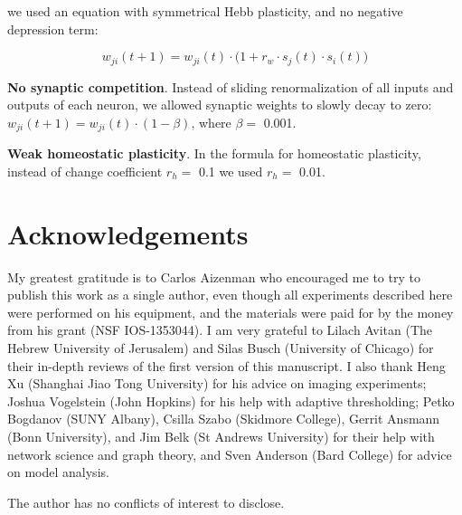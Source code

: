 \documentclass{article}
\begin{document}
we used an equation with symmetrical Hebb plasticity, and no negative depression term: 

\[ w_{ji}(t+1) = w_{ji}(t)\cdot\Big(1+r_w \cdot s_j(t) \cdot s_i(t)\Big) \]

\textbf{No synaptic competition}. Instead of sliding renormalization of all inputs and outputs of each neuron, we allowed synaptic weights to slowly decay to zero: $w_{ji}(t+1) = w_{ji}(t)\cdot (1-\beta)$, where $\beta=$ 0.001.

\textbf{Weak homeostatic plasticity}. In the formula for homeostatic plasticity, instead of change coefficient $r_h=$ 0.1 we used $r_h=$ 0.01.

\section*{Acknowledgements}

My greatest gratitude is to Carlos Aizenman who encouraged me to try to publish this work as a single author, even though all experiments described here were performed on his equipment, and the materials were paid for by the money from his grant (NSF IOS-1353044). I am very grateful to Lilach Avitan (The Hebrew University of Jerusalem) and Silas Busch (University of Chicago) for their in-depth reviews of the first version of this manuscript. I also thank Heng Xu (Shanghai Jiao Tong University) for his advice on imaging experiments; Joshua Vogelstein (John Hopkins) for his help with adaptive thresholding; Petko Bogdanov (SUNY Albany), Csilla Szabo (Skidmore College), Gerrit Ansmann (Bonn University), and Jim Belk (St Andrews University) for their help with network science and graph theory, and Sven Anderson (Bard College) for advice on model analysis.


The author has no conflicts of interest to disclose.

\nolinenumbers


\end{document}
